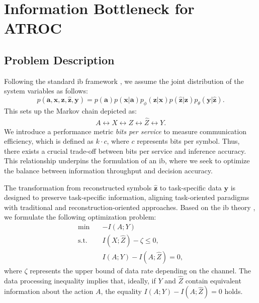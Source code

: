 \section{Information Bottleneck for ATROC}
\label{sec:AIB}
\subsection{Problem Description}
Following the standard \gls{ib} framework \cite{Alemi_2017_DVI, Tishby_1999_TIB}, we assume the joint distribution of the system variables as follows:
\begin{equation}
    p(\bm{a}, \bm{x}, \bm{z}, \hat{\bm{z}}, \bm{y}) = p(\bm{a})p(\bm{x}|\bm{a})p_{\phi}(\bm{z}|\bm{x})p(\hat{\bm{z}}|\bm{z})p_{\theta}(\bm{y}|\hat{\bm{z}}).
\end{equation}
This sets up the Markov chain depicted as:
\begin{align}
    A \leftrightarrow X \leftrightarrow Z \leftrightarrow \hat{Z} \leftrightarrow Y.
\end{align}
We introduce a performance metric \textit{bits per service} to measure communication efficiency, which is defined as $k\cdot c$, where $c$ represents bits per symbol. Thus, there exists a crucial trade-off between bits per service and inference accuracy. This relationship underpins the formulation of an \gls{ib}, where we seek to optimize the balance between information throughput and decision accuracy.

The transformation from reconstructed symbols $\hat{\bm{z}}$ to task-specific data $\bm{y}$ is designed to preserve task-specific information, aligning task-oriented paradigms with traditional and reconstruction-oriented approaches. Based on the \gls{ib} theory \cite{Tishby_1999_TIB, Alemi_2017_DVI}, we formulate the following optimization problem:
\begin{subequations}
    \begin{align}
    \min \quad&-I(A;Y) \\
    \text{s.t.} \quad&I(X;\hat{Z})-\zeta \leq 0, \\
    &I(A;Y) - I(A;\hat{Z})= 0, \label{eq_optim_data_pro}
    \end{align}
\end{subequations}
where $\zeta$ represents the upper bound of data rate depending on the channel. The data processing inequality \cite{Cover_1991_EoI} implies that, ideally, if $Y$ and $\hat{Z}$ contain equivalent information about the action $A$, the equality $I(A;Y) - I(A;\hat{Z})=0$ holds.

